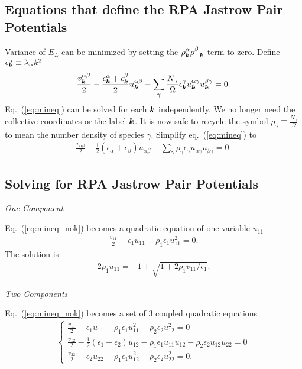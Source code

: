 \subsection{Equations that define the RPA Jastrow Pair Potentials}
Variance of $E_L$ can be minimized by setting the $\rho_{\boldsymbol{k}}^\alpha\rho_{-\boldsymbol{k}}^\beta$ term to zero. Define $\epsilon^\alpha_{\boldsymbol{k}}\equiv \lambda_\alpha k^2$
\begin{align}
\frac{v^{\alpha\beta}_{\boldsymbol{k}}}{2} - \frac{\epsilon^\alpha_{\boldsymbol{k}}+\epsilon^\beta_{\boldsymbol{k}}}{2}
u_{\boldsymbol{k}}^{\alpha\beta} -
\sum\limits_\gamma \frac{N_\gamma}{\Omega} \epsilon^\gamma_{\boldsymbol{k}} u_{\boldsymbol{k}}^{\alpha\gamma}u_{\boldsymbol{k}}^{\beta\gamma} = 0. \label{eq:mineq}
\end{align}
Eq.~(\ref{eq:mineq}) can be solved for each $\boldsymbol{k}$ independently. We no longer need the collective coordinates or the label $\boldsymbol{k}$. It is now safe to recycle the symbol $\rho_\gamma\equiv\frac{N_\gamma}{\Omega}$ to mean the number density of species $\gamma$. Simplify eq.~(\ref{eq:mineq}) to
\begin{align}
\boxed{\frac{v_{\alpha\beta}}{2} - \frac{1}{2}(\epsilon_\alpha+\epsilon_\beta)
u_{\alpha\beta} -
\sum\limits_\gamma \rho_\gamma \epsilon_\gamma 
u_{\alpha\gamma}u_{\beta\gamma} = 0 } . \label{eq:mineq_nok}
\end{align}

\subsection{Solving for RPA Jastrow Pair Potentials}

\textit{One Component}

Eq.~(\ref{eq:mineq_nok}) becomes a quadratic equation of one variable $u_{11}$
\begin{align}
\frac{v_{11}}{2} - \epsilon_1 u_{11} - \rho_1\epsilon_1u_{11}^2 = 0.
\end{align}
The solution is
\begin{align}
2\rho_1 u_{11} = -1 + \sqrt{1+2\rho_1v_{11}/\epsilon_1}. \label{eq:oc-rpa-uk}
\end{align}

\textit{Two Components}

Eq.~(\ref{eq:mineq_nok}) becomes a set of 3 coupled quadratic equations
\begin{align}
\left\{\begin{array}{l}
\frac{v_{11}}{2} - \epsilon_1 u_{11} - \rho_1\epsilon_1u_{11}^2 - \rho_2\epsilon_2u_{12}^2 = 0 \\
\frac{v_{12}}{2} - \frac{1}{2}(\epsilon_1+\epsilon_2) u_{12} - \rho_1\epsilon_1u_{11}u_{12} - \rho_2\epsilon_2u_{12}u_{22} = 0 \\
\frac{v_{22}}{2} - \epsilon_2 u_{22} - \rho_1\epsilon_1u_{12}^2 - \rho_2\epsilon_2u_{22}^2 = 0.
\end{array}\right.
\end{align}

